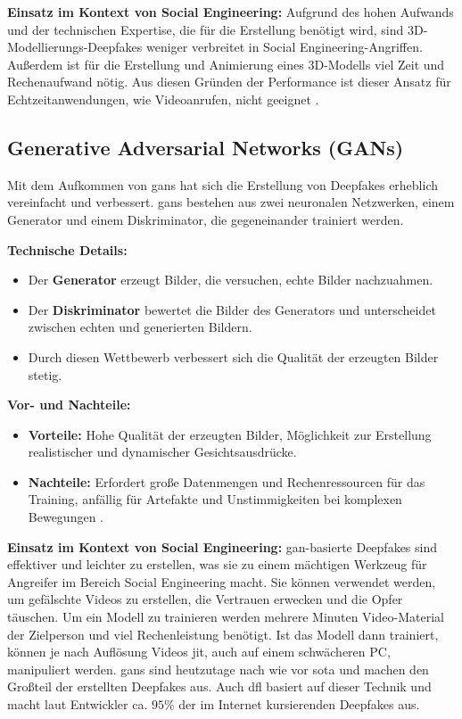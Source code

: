 \textbf{Einsatz im Kontext von Social Engineering:} Aufgrund des hohen Aufwands und der technischen Expertise, die für die Erstellung benötigt wird, sind 3D-Modellierungs-Deepfakes weniger verbreitet in Social Engineering-Angriffen.
Außerdem ist für die Erstellung und Animierung eines 3D-Modells viel Zeit und Rechenaufwand nötig.
Aus diesen Gründen der Performance ist dieser Ansatz für Echtzeitanwendungen, wie Videoanrufen, nicht geeignet \cite{social-engineering-a-survey}.

\subsection{Generative Adversarial Networks (GANs)}\label{subsec:gans}

Mit dem Aufkommen von \glspl{gan} hat sich die Erstellung von Deepfakes erheblich vereinfacht und verbessert.
\glspl{gan} bestehen aus zwei neuronalen Netzwerken, einem Generator und einem Diskriminator, die gegeneinander trainiert werden.\cite{Deepfakes-a-survey-and-introduction-to-the-topical-collection}

\textbf{Technische Details:}
\begin{itemize}
    \item Der \textbf{Generator} erzeugt Bilder, die versuchen, echte Bilder nachzuahmen.
    \item Der \textbf{Diskriminator} bewertet die Bilder des Generators und unterscheidet zwischen echten und generierten Bildern.
    \item Durch diesen Wettbewerb verbessert sich die Qualität der erzeugten Bilder stetig.
\end{itemize}

\textbf{Vor- und Nachteile:}
\begin{itemize}
    \item \textbf{Vorteile:} Hohe Qualität der erzeugten Bilder, Möglichkeit zur Erstellung realistischer und dynamischer Gesichtsausdrücke.
    \item \textbf{Nachteile:} Erfordert große Datenmengen und Rechenressourcen für das Training, anfällig für Artefakte und Unstimmigkeiten bei komplexen Bewegungen \cite{Deepfakes-An-Overview}.
\end{itemize}

\textbf{Einsatz im Kontext von Social Engineering:} \gls{gan}-basierte Deepfakes sind effektiver und leichter zu erstellen, was sie zu einem mächtigen Werkzeug für Angreifer im Bereich Social Engineering macht.
Sie können verwendet werden, um gefälschte Videos zu erstellen, die Vertrauen erwecken und die Opfer täuschen.
Um ein Modell zu trainieren werden mehrere Minuten Video-Material der Zielperson und viel Rechenleistung benötigt.
Ist das Modell dann trainiert, können je nach Auflösung Videos \gls{jit}, auch auf einem schwächeren PC, manipuliert werden.
\glspl{gan} sind heutzutage nach wie vor \gls{sota} und machen den Großteil der erstellten Deepfakes aus.
Auch \gls{dfl} basiert auf dieser Technik und macht laut Entwickler ca. $95\%$ der im Internet kursierenden Deepfakes aus\cite{dfl-github-repo}.

